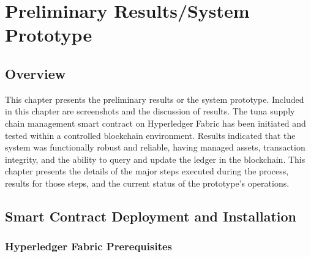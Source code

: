 \chapter{Preliminary Results/System Prototype}
\section{Overview}
This chapter  presents the preliminary results or the system prototype.  Included in this chapter are screenshots and the discussion of results. The tuna supply chain management smart contract on Hyperledger Fabric has been initiated and tested within a controlled blockchain environment. Results indicated that the system was functionally robust and reliable, having managed assets, transaction integrity, and the ability to query and update the ledger in the blockchain. This chapter presents the details of the major steps executed during the process, results for those steps, and the current status of the prototype's operations. 


\section{Smart Contract Deployment and Installation}

\subsection{Hyperledger Fabric Prerequisites}

